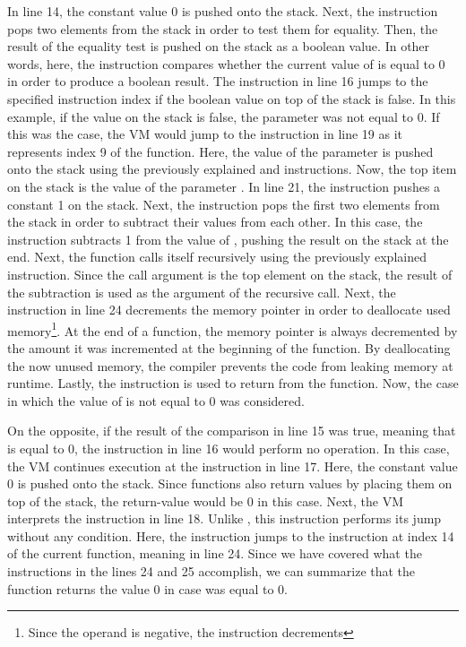 
In line 14, the constant value 0 is pushed onto the stack.
Next, the  instruction pops two elements from the stack in order to test them for equality.
Then, the result of the equality test is pushed on the stack as a boolean value.
In other words, here, the instruction compares whether the current value of  is equal to 0 in order to produce a boolean result.
The  instruction in line 16 jumps to the specified instruction index if the boolean value on top of the stack is false.
In this example, if the value on the stack is false, the parameter  was not equal to 0.
If this was the case, the VM would jump to the instruction in line 19 as it represents index 9 of the  function.
Here, the value of the parameter  is pushed onto the stack using the previously explained  and  instructions.
Now, the top item on the stack is the value of the parameter .
In line 21, the  instruction pushes a constant 1 on the stack.
Next, the  instruction pops the first two elements from the stack in order to subtract their values from each other.
In this case, the instruction subtracts 1 from the value of , pushing the result on the stack at the end.
Next, the  function calls itself recursively using the previously explained  instruction.
Since the call argument is the top element on the stack, the result of the subtraction is used as the argument of the recursive call.
Next, the  instruction in line 24 decrements the memory pointer in order to deallocate used memory\footnote{Since the operand is negative, the instruction decrements }.
At the end of a function, the memory pointer is always decremented by the amount it was incremented at the beginning of the function.
By deallocating the now unused memory, the compiler prevents the code from leaking memory at runtime.
Lastly, the  instruction is used to return from the  function.
Now, the case in which the value of  is not equal to 0 was considered.

On the opposite, if the result of the comparison in line 15 was true, meaning that  is equal to 0, the  instruction in line 16 would perform no operation.
In this case, the VM continues execution at the  instruction in line 17.
Here, the constant value 0 is pushed onto the stack.
Since functions also return values by placing them on top of the stack, the return-value would be 0 in this case.
Next, the VM interprets the  instruction in line 18.
Unlike , this instruction performs its jump without any condition.
Here, the instruction jumps to the instruction at index 14 of the current function, meaning  in line 24.
Since we have covered what the instructions in the lines 24 and 25 accomplish, we can summarize that the function returns the value 0 in case  was equal to 0.

